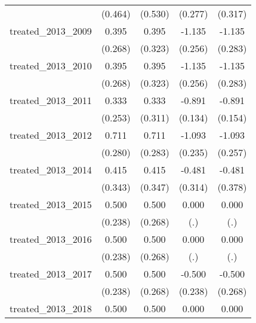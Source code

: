 {\begin{tabular}{l*{4}{c}}
            &     (0.464)         &     (0.530)         &     (0.277)         &     (0.317)         \\
[1em]
treated\_2013\_2009&       0.395         &       0.395         &      -1.135\sym{***}&      -1.135\sym{***}\\
            &     (0.268)         &     (0.323)         &     (0.256)         &     (0.283)         \\
[1em]
treated\_2013\_2010&       0.395         &       0.395         &      -1.135\sym{***}&      -1.135\sym{***}\\
            &     (0.268)         &     (0.323)         &     (0.256)         &     (0.283)         \\
[1em]
treated\_2013\_2011&       0.333         &       0.333         &      -0.891\sym{***}&      -0.891\sym{***}\\
            &     (0.253)         &     (0.311)         &     (0.134)         &     (0.154)         \\
[1em]
treated\_2013\_2012&       0.711\sym{*}  &       0.711\sym{*}  &      -1.093\sym{***}&      -1.093\sym{***}\\
            &     (0.280)         &     (0.283)         &     (0.235)         &     (0.257)         \\
[1em]
treated\_2013\_2014&       0.415         &       0.415         &      -0.481         &      -0.481         \\
            &     (0.343)         &     (0.347)         &     (0.314)         &     (0.378)         \\
[1em]
treated\_2013\_2015&       0.500\sym{*}  &       0.500         &       0.000         &       0.000         \\
            &     (0.238)         &     (0.268)         &         (.)         &         (.)         \\
[1em]
treated\_2013\_2016&       0.500\sym{*}  &       0.500         &       0.000         &       0.000         \\
            &     (0.238)         &     (0.268)         &         (.)         &         (.)         \\
[1em]
treated\_2013\_2017&       0.500\sym{*}  &       0.500         &      -0.500\sym{*}  &      -0.500         \\
            &     (0.238)         &     (0.268)         &     (0.238)         &     (0.268)         \\
[1em]
treated\_2013\_2018&       0.500\sym{*}  &       0.500         &       0.000         &       0.000         \\

\end{tabular}}
